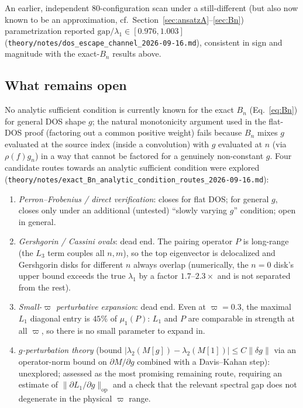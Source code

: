 \documentclass[11pt]{article}
\begin{document}
An earlier, independent 80-configuration scan under a still-different (but
also now known to be an approximation, cf.\ Section~\ref{sec:ansatzA}--\ref{sec:Bn})
parametrization reported $\mathrm{gap}/\lambda_1\in[0.976,1.003]$
(\texttt{theory/notes/dos\_escape\_channel\_2026-09-16.md}), consistent in
sign and magnitude with the exact-$B_n$ results above.

\subsection{What remains open}\label{sec:dos-open}

No analytic sufficient condition is currently known for the exact $B_n$
(Eq.~\ref{eq:Bn}) for general DOS shape $g$; the natural monotonicity
argument used in the flat-DOS proof (factoring out a common positive weight)
fails because $B_n$ mixes $g$ evaluated at the source index (inside a
convolution) with $g$ evaluated at $n$ (via $\rho(f)g_n$) in a way that
cannot be factored for a genuinely non-constant $g$. Four candidate routes
towards an analytic sufficient condition were explored
(\texttt{theory/notes/exact\_Bn\_analytic\_condition\_routes\_2026-09-16.md}):

\begin{enumerate}[nosep]
\item \emph{Perron--Frobenius / direct verification}: closes for flat DOS;
for general $g$, closes only under an additional (untested) ``slowly
varying $g$'' condition; open in general.
\item \emph{Gershgorin / Cassini ovals}: dead end. The pairing operator $P$
is long-range (the $L_3$ term couples all $n,m$), so the top eigenvector is
delocalized and Gershgorin disks for different $n$ always overlap
(numerically, the $n=0$ disk's upper bound exceeds the true $\lambda_1$ by a
factor $1.7$--$2.3\times$ and is not separated from the rest).
\item \emph{Small-$\varpi$ perturbative expansion}: dead end. Even at
$\varpi=0.3$, the maximal $L_1$ diagonal entry is $45\%$ of $\mu_1(P)$: $L_1$
and $P$ are comparable in strength at all $\varpi$, so there is no small
parameter to expand in.
\item \emph{$g$-perturbation theory} (bound $|\lambda_2(M[g])-\lambda_2(M[1])|\le C\|\delta g\|$
via an operator-norm bound on $\partial M/\partial g$ combined with a
Davis--Kahan step): unexplored; assessed as the most promising remaining
route, requiring an estimate of $\|\partial L_1/\partial g\|_{\text{op}}$ and
a check that the relevant spectral gap does not degenerate in the physical
$\varpi$ range.
\end{enumerate}
\end{document}
